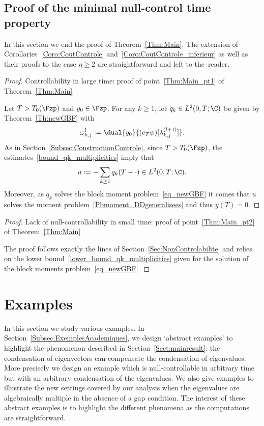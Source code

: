 


\subsection{Proof of the minimal null-control time property} \label{Subsec:NC_DDgeneralisees}


In this section we end the proof of Theorem~\ref{Thm:Main}. The extension of Corollaries~\ref{Coro:CoutControle} and~\ref{Coro:CoutControle_inferieur} as well as their proofs to the case $\eta \geq 2$ are straightforward and left to the~reader.

\begin{proof}{Controllability in large time: proof of point~\eqref{Thm:Main_pt1} of Theorem~\ref{Thm:Main}}


Let $T> T_0(\Fzp)$ and $y_0 \in \Fzp$. For any $k \geq 1$, let $q_k \in L^2(0,T ; \C)$ be given by Theorem~\ref{Th:newGBF} with
\[
\omega_{k,j}^l := \dual{y_0}{(e_T \psi) [\lambda_{k,j}^{(l+1)}] }.
\]
As in Section~\ref{Subsec:ConstructionControle}, since $T >T_0(\Fzp)$, the estimates~\eqref{bound_qk_multiplicities} imply that
\[
u := -\sum_{k \geq 1} q_k (T-\cdot) \in L^2(0,T ; \C).
\]
Moreover, as $q_k$ solves the block moment problem~\eqref{eq_newGBF} it comes that $u$ solves the moment problem~\eqref{Pbmoment_DDgeneralisees} and thus $y(T)=0$.
\end{proof}



\begin{proof}{Lack of null-controllability in small time: proof of point~\eqref{Thm:Main_pt2} of Theorem~\ref{Thm:Main}}

The proof follows exactly the lines of Section~\ref{Sec:NonControlabilite} and relies on the lower bound~\eqref{lower_bound_qk_multiplicities} given for the solution of the block moments problem~\eqref{eq_newGBF}.
\end{proof}



\section{Examples}\label{Sec:Examples}

In this section we study various examples. In Section~\ref{Subsec:ExemplesAcademiques}, we design `abstract examples' to highlight the phenomenon described in Section~\ref{Sect:mainresult}: the condensation of eigenvectors can compensate the condensation of eigenvalues. More precisely we design an example which is null-controllable in arbitrary time but with an arbitrary condensation of the eigenvalues. We also give examples to illustrate the new settings covered by our analysis when the eigenvalues are algebraically multiple in the absence of a gap condition. The interest of these abstract examples is to highlight the different phenomena as the computations are straightforward.


